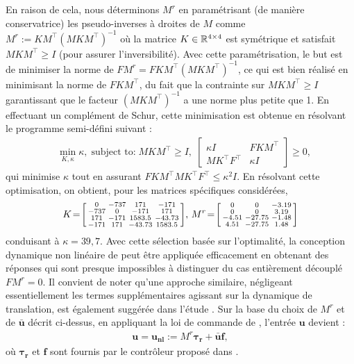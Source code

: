 En raison de cela, nous déterminons $M^r$ en paramétrisant (de manière conservatrice) les  pseudo-inverses à droites de $M$ comme $M^r := KM^\top ( MKM^\top)^{-1}$ où la matrice $K \in {\mathbb R}^{4\times 4}$ est symétrique et satisfait $MKM^\top \geq I$ (pour assurer l'inversibilité). Avec cette paramétrisation, le but est de minimiser la norme de $FM^r = F KM^\top ( MKM^\top)^{-1}$, ce qui est bien réalisé en minimisant la norme de $F KM^\top$, du fait que la contrainte sur $MKM^\top \geq I$ garantissant que le facteur $( MKM^\top)^{-1}$ a une norme plus petite que 1.
En effectuant un complément de Schur, cette minimisation est obtenue en résolvant le programme semi-défini suivant :
\begin{align*}
&  \min_{K, \kappa} \kappa, \; \mbox{subject to:}
\;  M K M^\top\! \geq \!I, \; 
  \begin{bmatrix}
  \kappa I  &\! F K M^\top \\ 
   M K^\top F^\top &\! \kappa I
  \end{bmatrix}\! \geq\! 0,
\end{align*}
qui minimise $\kappa$ tout en assurant $F K M^\top M K^\top F^\top \leq \kappa^2 I$.  En résolvant cette optimisation, on obtient, pour les matrices spécifiques considérées,
\begin{align*}
  K \!=\! \left[ \begin{smallmatrix}  0   &   -737   &    171   &   -171\\
      -737  &  0   &  -171  &     171\\
       171  &    -171    &   1583.5    &   -43.73\\
      -171  &     171    &   -43.73    &   1583.5 \end{smallmatrix} \right]\!, \,
  M^r \!=\! \left[ \begin{smallmatrix}0     &          0   &   -3.19\\
                 0      &         0   &    3.19\\
               -4.51    &  -27.75    &   -1.48\\
                4.51    &  -27.75    &    1.48 \end{smallmatrix} \right]
\end{align*}
conduisant à $\kappa = 39,7$. Avec cette sélection basée sur l'optimalité, la conception dynamique non linéaire de \cite{2020e-MicCenZacFra} peut être appliquée efficacement en obtenant des réponses qui sont presque impossibles à distinguer du cas entièrement découplé 
$FM^r=0$. Il convient de noter qu'une approche similaire, négligeant essentiellement les termes supplémentaires agissant sur la dynamique de translation, est également suggérée dans l'étude \cite{hamel_minhduc}. 
Sur la base du choix de $M^r$ et de $\boldsymbol{\bar u}$ décrit ci-dessus, en appliquant la loi de commande de \cite[eqn (19)]{2020e-MicCenZacFra}, l'entrée $\boldsymbol{u}$ devient :
\begin{align}
\label{eq:u_nonlin}
    \boldsymbol{u} = \boldsymbol{u_{\text{nl}}} := M^r \boldsymbol{\tau_{r}} + \boldsymbol{\bar u} \boldsymbol{f},
\end{align}
où $\boldsymbol{\tau_{r}}$ et $\boldsymbol{f}$ sont fournis par le contrôleur proposé dans \cite{2020e-MicCenZacFra}.


